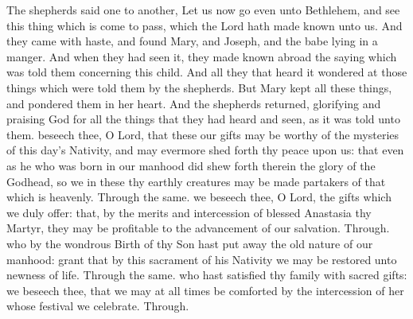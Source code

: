  The shepherds said one to another, Let us now go even unto Bethlehem, and see this thing which is come to pass, which the Lord hath made known unto us. And they came with haste, and found Mary, and Joseph, and the babe lying in a manger. And when they had seen it, they made known abroad the saying which was told them concerning this child. And all they that heard it wondered at those things which were told them by the shepherds. But Mary kept all these things, and pondered them in her heart. And the shepherds returned, glorifying and praising God for all the things that they had heard and seen, as it was told unto them.
\secret
{} beseech thee, O Lord, that these our gifts may be worthy of the mysteries of this day's Nativity, and may evermore shed forth thy peace upon us: that even as he who was born in our manhood did shew forth therein the glory of the Godhead, so we in these thy earthly creatures may be made partakers of that which is heavenly. Through the same.
 we beseech thee, O Lord, the gifts which we duly offer: that, by the merits and intercession of blessed Anastasia thy Martyr, they may be profitable to the advancement of our salvation. Through.
\postcommunion
{} who by the wondrous Birth of thy Son hast put away the old nature of our manhood: grant that by this sacrament of his Nativity we may be restored unto newness of life. Through the same.
 who hast satisfied thy family with sacred gifts: we beseech thee, that we may at all times be comforted by the intercession of her whose festival we celebrate. Through.

